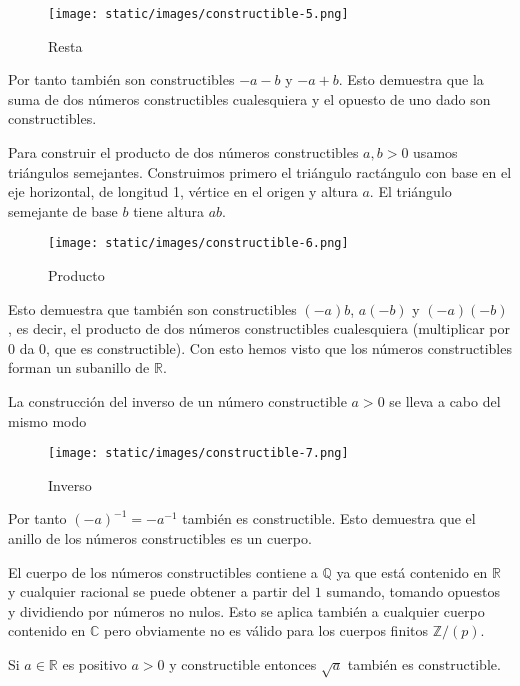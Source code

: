 \begin{figure}
\centering
\texttt{[image: static/images/constructible-5.png]}
\caption{Resta}
\end{figure}

Por tanto también son constructibles \(-a-b\) y \(-a+b\). Esto demuestra
que la suma de dos números constructibles cualesquiera y el opuesto de
uno dado son constructibles.

Para construir el producto de dos números constructibles \(a,b> 0\)
usamos triángulos semejantes. Construimos primero el triángulo
ractángulo con base en el eje horizontal, de longitud 1, vértice en el
origen y altura \(a\). El triángulo semejante de base \(b\) tiene altura
\(ab\).

\begin{figure}
\centering
\texttt{[image: static/images/constructible-6.png]}
\caption{Producto}
\end{figure}

Esto demuestra que también son constructibles \((-a)b\), \(a(-b)\) y
\((-a)(-b)\), es decir, el producto de dos números constructibles
cualesquiera (multiplicar por \(0\) da \(0\), que es constructible). Con
esto hemos visto que los números constructibles forman un subanillo de
\(\mathbb R\).

La construcción del inverso de un número constructible \(a> 0\) se lleva
a cabo del mismo modo

\begin{figure}
\centering
\texttt{[image: static/images/constructible-7.png]}
\caption{Inverso}
\end{figure}

Por tanto \((-a)^{-1}=-a^{-1}\) también es constructible. Esto demuestra
que el anillo de los números constructibles es un cuerpo. 


El cuerpo de los números constructibles contiene a \(\mathbb Q\) ya que
está contenido en \(\mathbb R\) y cualquier racional se puede obtener a
partir del \(1\) sumando, tomando opuestos y dividiendo por números no
nulos. Esto se aplica también a cualquier cuerpo contenido en
\(\mathbb C\) pero obviamente no es válido para los cuerpos finitos
\(\mathbb Z/(p)\). 


Si \(a\in\mathbb R\) es positivo \(a>0\) y constructible entonces
\(\sqrt{a}\) también es constructible. 


